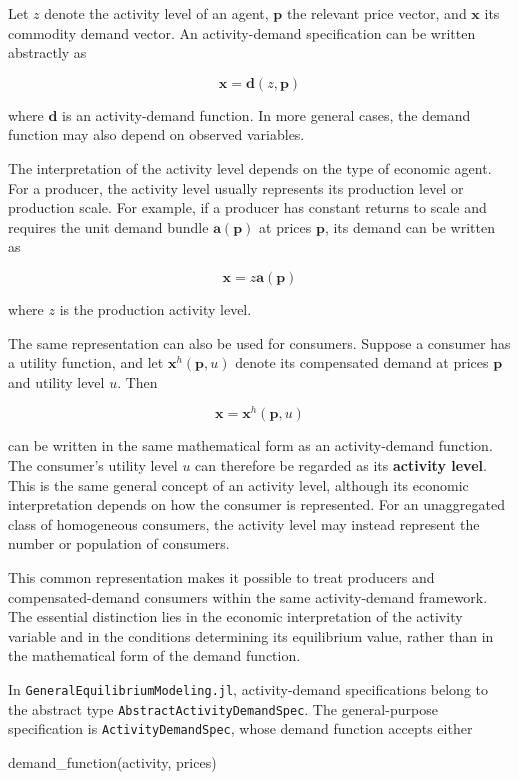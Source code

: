 \documentclass[
  letterpaper,
  DIV=11,
  numbers=noendperiod]{scrreprt}
\newenvironment{Shaded}{\begin{snugshade}}{\end{snugshade}}
\newcommand{\FunctionTok}[1]{\textcolor[rgb]{0.28,0.35,0.67}{#1}}
\newcommand{\NormalTok}[1]{\textcolor[rgb]{0.00,0.23,0.31}{#1}}
\begin{document}
Let \(z\) denote the activity level of an agent, \(\mathbf p\) the
relevant price vector, and \(\mathbf x\) its commodity demand vector. An
activity-demand specification can be written abstractly as

\[
\mathbf x=\mathbf d(z,\mathbf p)
\]

where \(\mathbf d\) is an activity-demand function. In more general
cases, the demand function may also depend on observed variables.

The interpretation of the activity level depends on the type of economic
agent. For a producer, the activity level usually represents its
production level or production scale. For example, if a producer has
constant returns to scale and requires the unit demand bundle
\(\mathbf a(\mathbf p)\) at prices \(\mathbf p\), its demand can be
written as

\[
\mathbf x=z\mathbf a(\mathbf p)
\]

where \(z\) is the production activity level.

The same representation can also be used for consumers. Suppose a
consumer has a utility function, and let \(\mathbf x^h(\mathbf p,u)\)
denote its compensated demand at prices \(\mathbf p\) and utility level
\(u\). Then

\[
\mathbf x=\mathbf x^h(\mathbf p,u)
\]

can be written in the same mathematical form as an activity-demand
function. The consumer's utility level \(u\) can therefore be regarded
as its \textbf{activity level}. This is the same general concept of an
activity level, although its economic interpretation depends on how the
consumer is represented. For an unaggregated class of homogeneous
consumers, the activity level may instead represent the number or
population of consumers.

This common representation makes it possible to treat producers and
compensated-demand consumers within the same activity-demand framework.
The essential distinction lies in the economic interpretation of the
activity variable and in the conditions determining its equilibrium
value, rather than in the mathematical form of the demand function.

In \texttt{GeneralEquilibriumModeling.jl}, activity-demand
specifications belong to the abstract type
\texttt{AbstractActivityDemandSpec}. The general-purpose specification
is \texttt{ActivityDemandSpec}, whose demand function accepts either

\begin{Shaded}
\begin{Highlighting}[]
\FunctionTok{demand\_function}\NormalTok{(activity, prices)}
\end{Highlighting}
\end{Shaded}
\end{document}
